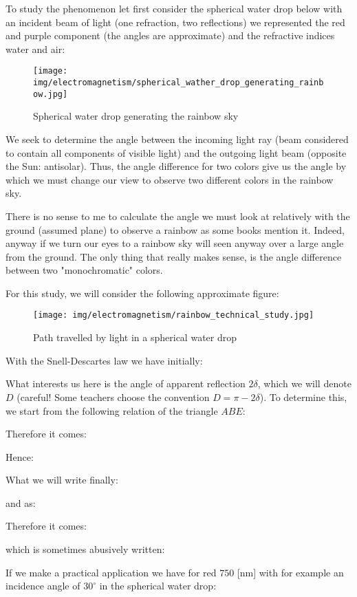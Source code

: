 	To study the phenomenon let first consider the spherical water drop below with an incident beam of light (one refraction, two reflections) we represented the red and purple component (the angles are approximate) and the refractive indices water and air:
	\begin{figure}[H]
		\centering
		\texttt{[image: img/electromagnetism/spherical\_wather\_drop\_generating\_rainbow.jpg]}
		\caption[]{Spherical water drop generating the rainbow sky}
	\end{figure}
	We seek to determine the angle between the incoming light ray (beam considered to contain all components of visible light) and the outgoing light beam (opposite the Sun: antisolar). Thus, the angle difference for two colors give us the angle by which we must change our view to observe two different colors in the rainbow sky.
	\begin{tcolorbox}[title=Remark,colframe=black,arc=10pt]
	There is no sense to me to calculate the angle we must look at relatively with the ground (assumed plane) to observe a rainbow as some books mention it. Indeed, anyway if we turn our eyes to a rainbow sky will seen anyway over a large angle from the ground. The only thing that really makes sense, is the angle difference between two "monochromatic" colors.
	\end{tcolorbox}
	For this study, we will consider the following approximate figure:
	\begin{figure}[H]
		\centering
		\texttt{[image: img/electromagnetism/rainbow\_technical\_study.jpg]}
		\caption[]{Path travelled by light in a spherical water drop}
	\end{figure}
	With the Snell-Descartes law we have initially:
	
	What interests us here is the angle of apparent reflection $2\delta$, which we will denote $D$ (careful! Some teachers choose the convention $D=\pi-2\delta$). To determine this, we start from the following relation of the triangle $ABE$:
	
	Therefore it comes:
	
	Hence:
	
	What we will write finally:
	
	and as:
	
	Therefore it comes:
	
	which is sometimes abusively written:
	
	If we make a practical application we have for red $750$ [nm] with for example an incidence angle of $30^\circ$ in the spherical water drop:
	
